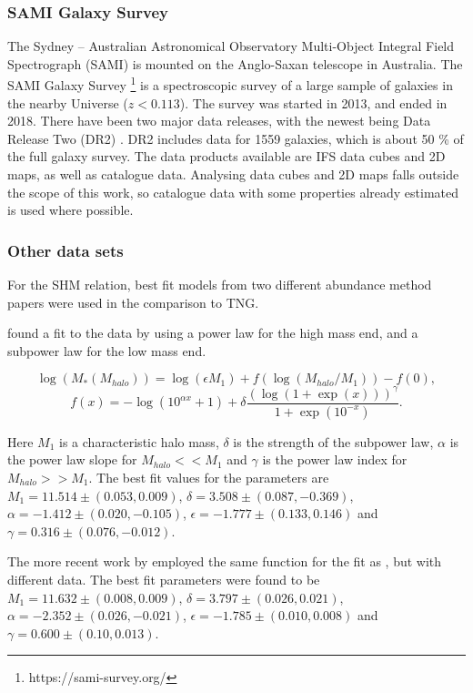 \subsubsection{SAMI Galaxy Survey}
The Sydney – Australian Astronomical Observatory Multi-Object Integral Field Spectrograph (SAMI) is mounted on the Anglo-Saxan telescope in Australia. The SAMI Galaxy Survey \footnote{https://sami-survey.org/} is a spectroscopic survey of a large sample of galaxies in the nearby Universe ($z < 0.113$). The survey was started in 2013, and ended in 2018. There have been two major data releases, with the newest being Data Release Two (DR2) \parencite{Scott2018}. DR2 includes data for 1559 galaxies, which is about 50 \% of the full galaxy survey. The data products available are IFS data cubes and 2D maps, as well as catalogue data. Analysing data cubes and 2D maps falls outside the scope of this work, so catalogue data with some properties already estimated is used where possible. 

\subsubsection{Other data sets}
For the SHM relation, best fit models from two different abundance method papers were used in the comparison to TNG.

\textcite{Behroozi2013} found a fit to the data by using a power law for the high mass end, and a subpower law for the low mass end.

\begin{equation} \label{eq_behroozi}
    \log(M_*(M_{halo})) = \log(\epsilon M_1) + f(\log(M_{halo}/M_1)) -f(0),
\end{equation}
\begin{equation*}
    f(x) = -\log(10^{\alpha x}+1)+\delta \frac{(\log(1+\exp(x)))^\gamma}{1 +\exp(10^{-x})}.
\end{equation*}

Here $M_1$ is a characteristic halo mass, $\delta$ is the strength of the subpower law, $\alpha$ is the power law slope for $M_{halo} << M_1$ and $\gamma$ is the power law index for $M_{halo} >> M_1$. The best fit values for the parameters are $M_1 = 11.514\pm(0.053, 0.009)$, $\delta = 3.508 \pm (0.087, -0.369)$, $\alpha = -1.412 \pm (0.020, -0.105)$, $\epsilon = -1.777 \pm (0.133, 0.146)$ and $\gamma = 0.316 \pm (0.076, -0.012)$.

The more recent work by \textcite{Zanisi2019} employed the same function for the fit as \textcite{Behroozi2013}, but with different data. The best fit parameters were found to be $M_1 = 11.632\pm(0.008, 0.009)$, $\delta = 3.797 \pm (0.026, 0.021)$, $\alpha = -2.352 \pm (0.026, -0.021)$, $\epsilon = -1.785 \pm (0.010, 0.008)$  and $\gamma = 0.600 \pm (0.10, 0.013)$.

